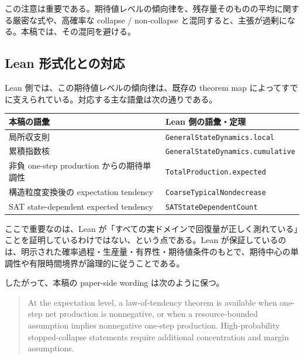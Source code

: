 \documentclass[12pt,a4paper]{article}
\begin{document}
この注意は重要である。期待値レベルの傾向律を、残存量そのものの平均に関する厳密な式や、高確率な collapse / non-collapse と混同すると、主張が過剰になる。本稿では、その混同を避ける。

\subsection{Lean 形式化との対応}\label{lean-ux5f62ux5f0fux5316ux3068ux306eux5bfeux5fdc}

Lean 側では、この期待値レベルの傾向律は、既存の theorem map によってすでに支えられている。対応する主な語彙は次の通りである。

{\def\LTcaptype{table} %
\begin{longtable}[]{@{}
  >{\raggedright\arraybackslash}p{}
  >{\raggedright\arraybackslash}p{}@{}}
\toprule\noalign{}
\begin{minipage}[b]{\linewidth}\raggedright
本稿の語彙
\end{minipage} & \begin{minipage}[b]{\linewidth}\raggedright
Lean 側の語彙・定理
\end{minipage} \\
\midrule\noalign{}
\endhead
\bottomrule\noalign{}
\endlastfoot
局所収支則 & \texttt{GeneralStateDynamics.local} \\
累積指数核 & \texttt{GeneralStateDynamics.cumulative} \\
非負 one-step production からの期待単調性 & \texttt{TotalProduction.expected} \\
構造粒度変換後の expectation tendency & \texttt{CoarseTypicalNondecrease} \\
SAT state-dependent expected tendency & \texttt{SATStateDependentCount} \\
\end{longtable}
}

ここで重要なのは、Lean が「すべての実ドメインで回復量が正しく測れている」ことを証明しているわけではない、という点である。Lean が保証しているのは、明示された確率過程・生産量・有界性・期待値条件のもとで、期待中心の単調性や有限時間境界が論理的に従うことである。

したがって、本稿の paper-side wording は次のように保つ。

\begin{quote}
At the expectation level, a law-of-tendency theorem is available when one-step net production is nonnegative, or when a resource-bounded assumption implies nonnegative one-step production. High-probability stopped-collapse statements require additional concentration and margin assumptions.
\end{quote}
\end{document}
